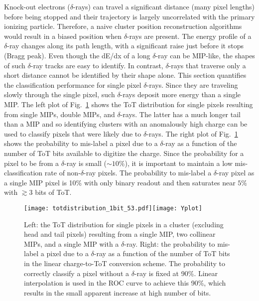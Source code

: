 \documentclass[12pt]{article}
\begin{document}
Knock-out electrons ($\delta$-rays) can travel a significant distance (many pixel lengths) before being stopped and their trajectory is largely uncorrelated with the primary ionizing particle.  Therefore, a naive cluster position reconstruction algorithms would result in a biased position when $\delta$-rays are present.  The energy profile of a $\delta$-ray changes  along its path length, with a significant raise just before it stops (Bragg peak).  Even though the dE/dx of a long $\delta$-ray can be MIP-like, the shapes of such $\delta$-ray tracks are easy to identify.  In contrast, $\delta$-rays that traverse only a short distance cannot be identified by their shape alone.  This section quantifies the classification performance for single pixel $\delta$-rays.  Since they are traveling slowly through the single pixel, such $\delta$-rays deposit more energy than a single MIP.  The left plot of Fig.~\ref{fig:deltarays} shows the ToT distribution for single pixels resulting from single MIPs, double MIPs, and $\delta$-rays. The latter has a much longer tail than a MIP and so identifying clusters with an anomalously high charge can be used to classify pixels that were likely due to $\delta$-rays.  The right plot of Fig.~\ref{fig:deltarays} shows the probability to mis-label a pixel due to a $\delta$-ray as a function of the number of ToT bits available to digitize the charge.  Since the probability for a pixel to be from a $\delta$-ray is small ($\sim 10\%$), it is important to maintain a low mis-classification rate of non-$\delta$-ray pixels.  The probability to mis-label a $\delta$-ray pixel as a single MIP pixel is 10\% with only binary readout and then saturates near $5\%$ with $\gtrsim 3$ bits of ToT. 

\begin{figure}[h!]
\centering
\texttt{[image: totdistribution\_1bit\_53.pdf]}\texttt{[image: Yplot]}
\caption{Left: the ToT distribution for single pixels in a cluster (excluding head and tail pixels) resulting from a single MIP, two collinear MIPs, and a single MIP with a $\delta$-ray.  Right: the probability to mis-label a pixel due to a $\delta$-ray as a function of the number of ToT bits in the linear charge-to-ToT conversion scheme.  The probability to correctly classify a pixel without a $\delta$-ray is fixed at 90\%.  Linear interpolation is used in the ROC curve to achieve this 90\%, which results in the small apparent increase at high number of bits.}
\label{fig:deltarays}
\end{figure}
\end{document}
